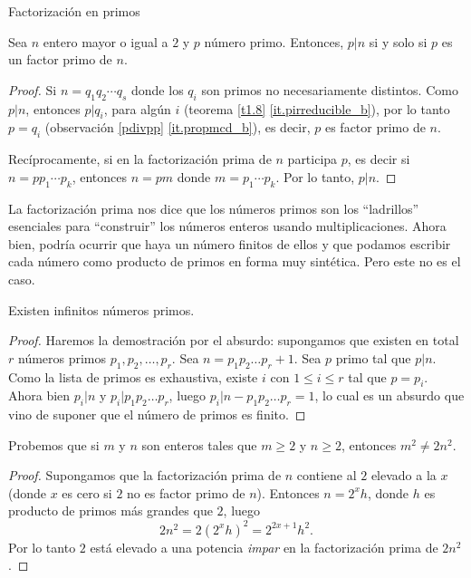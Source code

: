 \begin{section}{Factorización en primos}
\begin{proposicion}
    Sea $n$  entero mayor o igual a $2$ y $p$ número primo. Entonces, $p|n$ si y solo si $p$ es un factor primo de $n$.
\end{proposicion}
\begin{proof}
    Si $n = q_1q_2 \cdots q_s$ donde los $q_i$ son primos no necesariamente distintos. Como $p|n$,  entonces $p|q_i$, para algún $i$ (teorema \ref{t1.8} \ref{it.pirreducible_b}), por lo tanto $p=q_i$ (observación \ref{pdivpp} \ref{it.propmcd_b}),  es decir, $p$ es factor primo de $n$.

    Recíprocamente, si en la factorización prima de $n$ participa $p$,  es decir si $n= p p_1 \cdots p_k$,  entonces $n = pm$ donde $m = p_1 \cdots p_k$. Por lo tanto, $p|n$.
\end{proof}


La factorización prima nos dice que los números primos son los  ``ladrillos'' esenciales para  ``cons\-truir'' los números enteros usando multiplicaciones. Ahora bien, podría ocurrir que haya un número finitos de ellos y que podamos escribir cada número como producto de primos en forma muy sintética. Pero este no es el caso.

\begin{proposicion} Existen infinitos números primos. 
\end{proposicion} 
\begin{proof} Haremos la demostración por el absurdo: supongamos que existen en total $r$ números primos $p_1,p_2,\ldots, p_r$. Sea $n =  p_1p_2\ldots p_r+1$. Sea $p$ primo tal que $p|n$. Como la lista de primos es exhaustiva, existe $i$ con $1 \le i \le r$ tal que $p=p_i$. Ahora bien $p_i| n$ y $p_i|p_1p_2\ldots p_r$, luego $p_i|n-p_1p_2\ldots p_r =1$, lo cual es un absurdo que vino de suponer que el número de primos es finito.  
\end{proof}



\begin{ejemplo*} Probemos que si $m$ y $n$ son enteros tales que $m\ge 2$ y $n\ge 2$, entonces $m^2  \not=2n^2$.
\end{ejemplo*}
\begin{proof} Supongamos que la factorización prima de $n$ contiene al $2$ elevado a la $x$ (donde $x$ es cero si $2$ no es factor primo de $n$). Entonces $n=2^xh$, donde $h$ es producto de primos más grandes que $2$, luego 
$$
2n^2=2(2^xh)^2= 2^{2x+1}h^2.
$$
Por lo tanto $2$ está elevado a una potencia \textit{impar} en la factorización prima de $2n^2$.


\end{proof}
\end{section}
